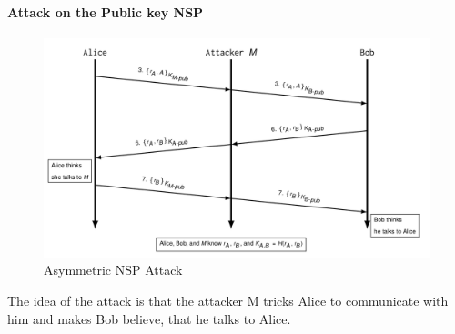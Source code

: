 \paragraph{Attack on the Public key NSP}
\begin{figure}[H]
  \centering
  \includegraphics[width=.7\textwidth]{figures/asymmetric_nsp_attack.png}
  \caption{Asymmetric NSP Attack}\label{fig:asymmetric_nsp_attack}
\end{figure}
The idea of the attack is that the attacker M tricks Alice to communicate with him and makes Bob believe, that he talks to Alice.
